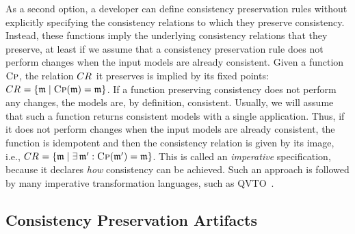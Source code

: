As a second option, a developer can define consistency preservation rules without explicitly specifying the consistency relations to which they preserve consistency.
Instead, these functions imply the underlying consistency relations that they preserve, at least if we assume that a consistency preservation rule does not perform changes when the input models are already consistent.
Given a function $\textsc{Cp}$, the relation $\consistencyrelation{CR}{}$ it preserves is implied by its fixed points: $\consistencyrelation{CR}{} = \setted{\modeltuple{m} \mid \function{Cp}(\modeltuple{m}) = \modeltuple{m}}$.
If a function preserving consistency does not perform any changes, the models are, by definition, consistent.
Usually, we will assume that such a function returns consistent models with a single application.
Thus, if it does not perform changes when the input models are already consistent, the function is idempotent and then the consistency relation is given by its image, i.e., $\consistencyrelation{CR}{} = \setted{\modeltuple{m} \mid \exists \modeltuple{m}' : \function{Cp}(\modeltuple{m}') = \modeltuple{m}}$.
This is called an \emph{imperative} specification, because it declares \emph{how} consistency can be achieved.
Such an approach is followed by many imperative transformation languages, such as \gls{QVTO}~\cite{qvt}.


\subsection{Consistency Preservation Artifacts}

